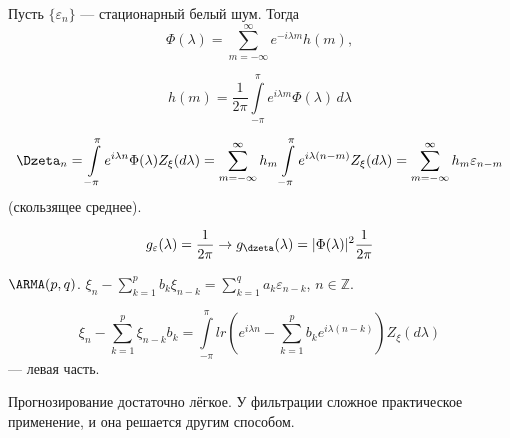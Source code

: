 \begin{example}
  Пусть $ \{\varepsilon_n\} $ --- стационарный белый шум. Тогда  
  \[
    \Phi(\lambda) = \sum_{m=-\infty}^\infty e^{-i\lambda m} h(m),
  \]
   
 \[
   h(m) = \frac{1}{2\pi}\int\limits_{-\pi}^{\pi}e^{i\lambda
   m}\Phi(\lambda)\,d\lambda
 \]
  
\[
  \Dzeta_n = \int\limits_{-\pi}^{\pi}e^{i\lambda n}\Phi(\lambda)Z_\xi(d\lambda)
  = \sum_{m=-\infty}^\infty h_m
  \int\limits_{-\pi}^{\pi}e^{i\lambda(n-m)}Z_\xi(d\lambda) =
  \sum_{m=-\infty}^{\infty}h_m\varepsilon_{n-m}
\]
(скользящее среднее). 
 
\[
  g_\varepsilon(\lambda) = \frac{1}{2\pi} \to g_\dzeta(\lambda) =
  |\Phi(\lambda)|^2 \frac{1}{2\pi}
\]
\end{example}

\begin{example}
  $\ARMA(p, q)$.  $ \xi_n - \sum_{k=1}^p b_k \xi_{n-k} = \sum_{k=1}^q a_k
  \varepsilon_{n-k} $, $ n \in \mathbb Z $.

   
 \[
   \xi_n - \sum_{k=1}^p \xi_{n-k} b_k = \int\limits_{-\pi}^{\pi}lr(e^{i\lambda
   n} - \sum_{k=1}^p b_k e^{i\lambda(n-k)})Z_\xi(d\lambda)
 \]
 --- левая часть.
\end{example}

Прогнозирование достаточно лёгкое. У фильтрации сложное практическое применение,
и она решается другим способом.


